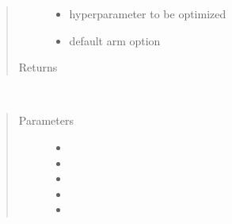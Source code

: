 \documentclass[letterpaper,10pt,english]{sphinxmanual}
\begin{document}
\begin{fulllineitems}
\begin{fulllineitems}
\begin{quote}
\begin{description}
\begin{itemize}
\item {} 
 \textendash{} hyperparameter to be optimized

\item {} 
 \textendash{} default arm option

\end{itemize}

\item[{Returns}] \leavevmode


\end{description}\end{quote}

\end{fulllineitems}


\begin{fulllineitems}
\label{\detokenize{index:classifiers.ada_sklearn.Ada.get_search_space}}
\end{fulllineitems}


\begin{fulllineitems}
\label{\detokenize{index:classifiers.ada_sklearn.Ada.run_solver}}~\begin{quote}\begin{description}
\item[{Parameters}] \leavevmode\begin{itemize}
\item {} 
 \textendash{} 

\item {} 
 \textendash{} 

\item {} 
 \textendash{} 

\item {} 
 \textendash{} 

\item {} 
 \textendash{} 


\end{itemize}
\end{description}
\end{quote}
\end{fulllineitems}
\end{fulllineitems}
\end{document}
